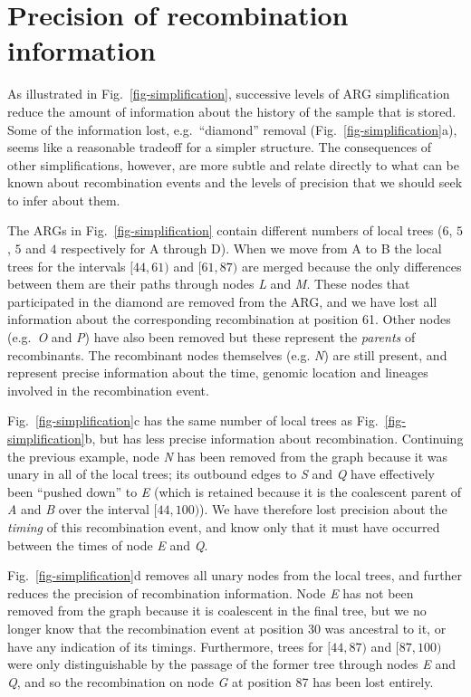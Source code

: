 \documentclass[9pt,twocolumn,twoside]{gsajnl}
\newcommand{\noderef}[1]{\textit{#1}}
\begin{document}
\section{Precision of recombination information}
\label{sec-precision}
As illustrated in Fig.~\ref{fig-simplification}, successive levels
of ARG simplification reduce the amount of information about the
history of the sample that is stored. Some of the information lost,
e.g.\ ``diamond'' removal (Fig.~\ref{fig-simplification}a),
seems like a reasonable tradeoff for a simpler structure.
The consequences of other simplifications, however, are
more subtle and relate directly to what can be known about
recombination events and the levels of precision that
we should seek to infer about them.

The ARGs in Fig.~\ref{fig-simplification} contain different
numbers of local trees ($6$, $5$, $5$ and $4$ respectively for A through
D). When we move from A to B the local trees
for the intervals $[44,61)$ and $[61,87)$ are merged because
the only differences between them are their paths through
nodes \noderef{L} and \noderef{M}. These nodes that participated
in the diamond are removed from the ARG, and we have lost
all information about the corresponding recombination at
position 61. Other nodes (e.g.\ \noderef{O} and \noderef{P})
have also been removed but these represent the \emph{parents}
of recombinants. The recombinant nodes themselves
(e.g. \noderef{N}) are still present, and represent precise
information about the time, genomic location and
lineages involved in the recombination event.

Fig.~\ref{fig-simplification}c has the same number of local trees
as Fig.~\ref{fig-simplification}b, but has less precise information
about recombination. Continuing the previous example, node
\noderef{N} has been removed from the graph because it was unary
in all of the local trees; its outbound edges to \noderef{S}
and \noderef{Q} have effectively been ``pushed down''
to \noderef{E} (which is retained because it is the coalescent
parent of \noderef{A} and \noderef{B} over the interval
$[44, 100)$). We
have therefore lost precision about
the \emph{timing} of this recombination event, and know only
that it must have occurred between the times of node \noderef{E}
and \noderef{Q}.

Fig.~\ref{fig-simplification}d removes all unary nodes from the
local trees, and further reduces the precision of
recombination information. Node \noderef{E} has not been
removed from the graph because it is coalescent in the
final tree, but we no longer know that the recombination
event at position 30 was ancestral to it, or have
any indication of its timings. Furthermore,
trees for $[44, 87)$ and $[87, 100)$ were only distinguishable
by the passage of the former tree through nodes \noderef{E}
and \noderef{Q}, and so the recombination on node \noderef{G}
at position 87 has been lost entirely.
\end{document}
